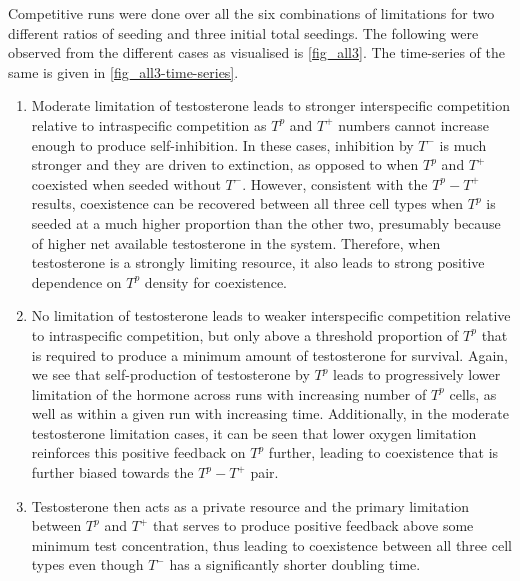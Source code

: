 Competitive runs were done over all the six combinations of limitations for two different ratios of seeding and three initial total seedings. The following were observed from the different cases as visualised is \autoref{fig_all3}. The time-series of the same is given in \autoref{fig_all3-time-series}.
\begin{enumerate}
  \item Moderate limitation of testosterone leads to  stronger interspecific competition relative to intraspecific competition as $T^p$ and $T^+$ numbers cannot increase enough to produce self-inhibition. In these cases, inhibition by $T^-$ is much stronger and they are driven to extinction, as opposed to when $T^p$ and $T^+$ coexisted when seeded without $T^-$. However, consistent with the $T^p - T^+$ results, coexistence can be recovered between all three cell types when $T^p$ is seeded at a much higher proportion than the other two, presumably because of higher net available testosterone in the system. Therefore, when testosterone is a strongly limiting resource, it also leads to strong positive dependence on $T^p$ density for coexistence.
  \item No limitation of testosterone leads to weaker interspecific competition relative to intraspecific competition, but only above a threshold proportion of $T^p$ that is required to produce a minimum amount of testosterone for survival. Again, we see that self-production of testosterone by $T^p$ leads to progressively lower limitation of the hormone across runs with increasing number of $T^p$ cells, as well as within a given run with increasing time. Additionally, in the moderate testosterone limitation cases, it can be seen that lower oxygen limitation reinforces this positive feedback on $T^p$ further, leading to coexistence that is further biased towards the $T^p - T^+$ pair.
  \item Testosterone then acts as a private resource and the primary limitation between $T^p$ and $T^+$ that serves to produce positive feedback above some minimum test concentration, thus leading to coexistence between all three cell types even though $T^-$ has a significantly shorter doubling time.
\end{enumerate}
